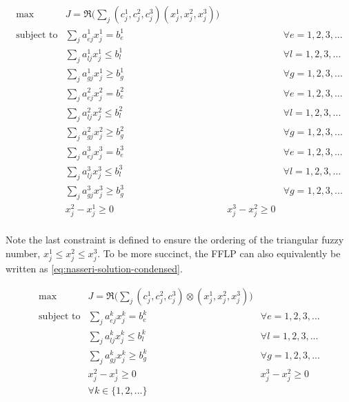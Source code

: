 \documentclass[ee,msthesis]{usuthesis}
\begin{document}
\begin{equation}
\label{eq:nasseri-solution}
\begin{array}{lclc}
\text{max}   & J = \mathfrak{R}\Big(\sum_j (c_j^1,c_j^2,c_j^3)(x_j^1,x_j^2,x_j^3)\Big) &\\
\text{subject to} & \sum_j a_{ej}^1 x_j^1 = b_e^1 & & \forall e = 1,2,3,... \\
                  & \sum_j a_{lj}^1 x_j^1 \le b_l^1 & & \forall l = 1,2,3,... \\
                  & \sum_j a_{gj}^1 x_j^1 \ge b_g^1  & & \forall g = 1,2,3,... \\
                  & \sum_j a_{ej}^2 x_j^2 = b_e^2 & & \forall e = 1,2,3,... \\
                  & \sum_j a_{lj}^2 x_j^2 \le b_l^2 & & \forall l = 1,2,3,... \\
                  & \sum_j a_{gj}^2 x_j^2 \ge b_g^2  & & \forall g = 1,2,3,... \\
                  & \sum_j a_{ej}^3 x_j^3 = b_e^3 & & \forall e = 1,2,3,... \\
                  & \sum_j a_{lj}^3 x_j^3 \le b_l^3 & & \forall l = 1,2,3,... \\
                  & \sum_j a_{gj}^3 x_j^3 \ge b_g^3  & & \forall g = 1,2,3,... \\
                  & x_j^2 - x_j^1 \ge 0         & x_j^3 - x_j^2 \ge 0 & \\
\end{array}
\end{equation}

\noindent Note the last constraint is defined to ensure the ordering of the triangular fuzzy number, \(x_j^1 \le x_j^2 \le x_j^3\).
To be more succinct, the FFLP can also equivalently be written as \ref{eq:nasseri-solution-condensed}.

\begin{equation}
\label{eq:nasseri-solution-condensed}
\begin{array}{llc}
\text{max}   & J = \mathfrak{R}\Big(\sum_j (c_j^1,c_j^2,c_j^3) \otimes (x_j^1,x_j^2,x_j^3)\Big) &\\
\text{subject to} & \sum_j a_{ej}^k x_j^k = b_e^k &  \forall e = 1,2,3,... \\
                  & \sum_j a_{lj}^k x_j^k \le b_l^k &  \forall l = 1,2,3,... \\
                  & \sum_j a_{gj}^k x_j^k \ge b_g^k  &  \forall g = 1,2,3,... \\
                  & x_j^2 - x_j^1 \ge 0         & x_j^3 - x_j^2 \ge 0 \\
                  & \forall k \in \{1,2,...\}        &                  \\
\end{array}
\end{equation}
\end{document}
